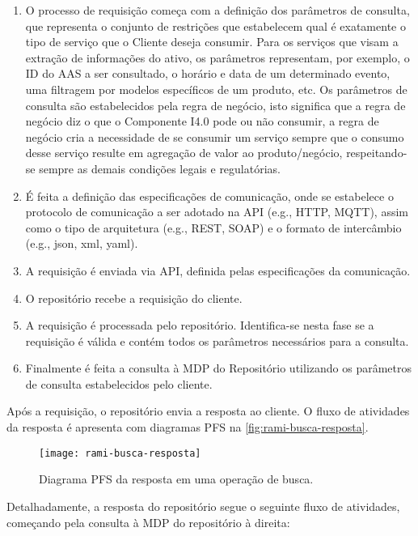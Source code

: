 	\begin{enumerate}
		\item O processo de requisição começa com a definição dos parâmetros de consulta, que representa o conjunto de restrições que estabelecem qual é exatamente o tipo de serviço que o Cliente deseja consumir. Para os serviços que visam a extração de informações do ativo, os parâmetros representam, por exemplo, o ID do AAS a ser consultado, o horário e data de um determinado evento, uma filtragem por modelos específicos de um produto, etc. Os parâmetros de consulta são estabelecidos pela regra de negócio, isto significa que a regra de negócio diz o que o Componente I4.0 pode ou não consumir, a regra de negócio cria a necessidade de se consumir um serviço sempre que o consumo desse serviço resulte em agregação de valor ao produto/negócio, respeitando-se sempre as demais condições legais e regulatórias.
		\item É feita a definição das especificações de comunicação, onde se estabelece o protocolo de comunicação a ser adotado na API (e.g., HTTP, MQTT), assim como o tipo de arquitetura (e.g., REST, SOAP) e o formato de intercâmbio (e.g., json, xml, yaml).
		\item A requisição é enviada via API, definida pelas especificações da comunicação.
		\item O repositório recebe a requisição do cliente.
		\item A requisição é processada pelo repositório. Identifica-se nesta fase se a requisição é válida e contém todos os parâmetros necessários para a consulta.
		\item Finalmente é feita a consulta à MDP do Repositório utilizando os parâmetros de consulta estabelecidos pelo cliente.
	\end{enumerate}

	Após a requisição, o repositório envia a resposta ao cliente. O fluxo de atividades da resposta é apresenta com diagramas PFS na \autoref{fig:rami-busca-resposta}.

	\begin{figure}[htb]
		\centering
		\caption{Diagrama PFS da resposta em uma operação de busca.}
		\label{fig:rami-busca-resposta}
		\texttt{[image: rami-busca-resposta]}
	\end{figure}

	Detalhadamente, a resposta do repositório segue o seguinte fluxo de atividades, começando pela consulta à MDP do repositório à direita:
	
